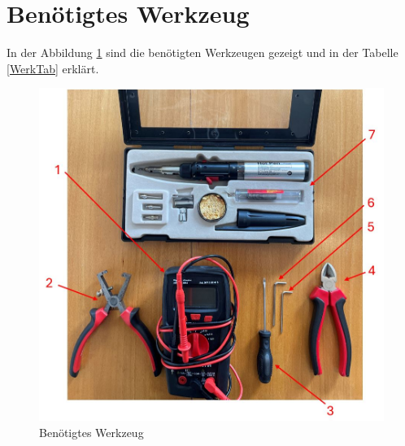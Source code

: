 \section{Benötigtes Werkzeug}
In der Abbildung \ref{Benwerk} sind die benötigten Werkzeugen gezeigt und in der Tabelle \ref{WerkTab} erklärt. 

\begin{figure}[H]
	\begin{center}
		\includegraphics[width=\textwidth]{Images/BenWerk.jpg}
		\caption{Benötigtes Werkzeug} \label{Benwerk}
	\end{center}
\end{figure}

